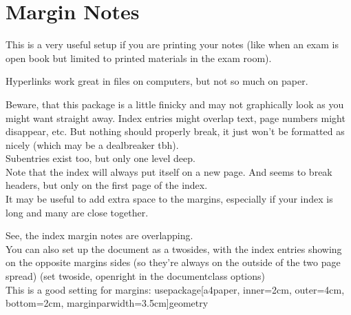 \documentclass[11pt]{article}
\begin{document}
\section{Margin Notes}
This is a very useful setup if you are printing your notes (like when an exam is open book but limited to printed materials in the exam room).

Hyperlinks work great in files on computers, but not so much on paper. 

Beware, that this package is a little finicky and may not graphically look as you might want straight away. Index entries might overlap text, page numbers might disappear, etc. But nothing should properly break, it just won't be formatted as nicely (which may be a dealbreaker tbh). \\

Subentries exist too, but only one level deep. \\ 


Note that the index will always put itself on a new page. And seems to break headers, but only on the first page of the index. \\


It may be useful to add extra space to the margins, especially if your index is long and many are close together. 

See, the index margin notes are overlapping. \\


You can also set up the document as a twosides, with the index entries showing on the opposite margins sides (so they're always on the outside of the two page spread) (set twoside, openright in the documentclass options) \\

This is a good setting for margins: usepackage[a4paper, inner=2cm, outer=4cm, bottom=2cm, marginparwidth=3.5cm]{geometry}

\printindex

\appendix

\end{document}
